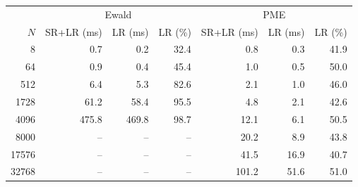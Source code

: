 \begin{tabular}{r | r r r | r r r}
\toprule
  \multicolumn{1}{c}{} & \multicolumn{3}{c}{Ewald} & \multicolumn{3}{c}{PME} \\ 
           $N$  &      SR+LR (ms)  &         LR (ms)  &         LR (\%)  &      SR+LR (ms)  &         LR (ms)  &         LR (\%) \\ 
\midrule
             8  &       \num{0.7}  &       \num{0.2}  &      \num{32.4}  &       \num{0.8}  &       \num{0.3}  &      \num{41.9} \\ 
            64  &       \num{0.9}  &       \num{0.4}  &      \num{45.4}  &       \num{1.0}  &       \num{0.5}  &      \num{50.0} \\ 
           512  &       \num{6.4}  &       \num{5.3}  &      \num{82.6}  &       \num{2.1}  &       \num{1.0}  &      \num{46.0} \\ 
          1728  &      \num{61.2}  &      \num{58.4}  &      \num{95.5}  &       \num{4.8}  &       \num{2.1}  &      \num{42.6} \\ 
          4096  &     \num{475.8}  &     \num{469.8}  &      \num{98.7}  &      \num{12.1}  &       \num{6.1}  &      \num{50.5} \\ 
          8000  &              --  &              --  &              --  &      \num{20.2}  &       \num{8.9}  &      \num{43.8} \\ 
         17576  &              --  &              --  &              --  &      \num{41.5}  &      \num{16.9}  &      \num{40.7} \\ 
         32768  &              --  &              --  &              --  &     \num{101.2}  &      \num{51.6}  &      \num{51.0} \\ 
\bottomrule
\end{tabular}
